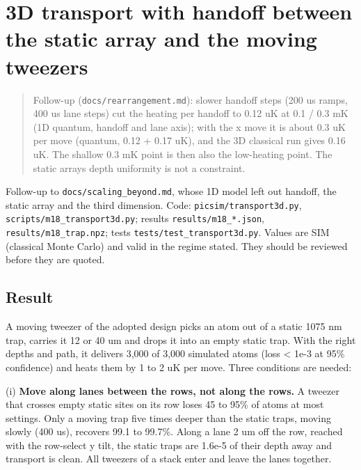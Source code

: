 \hypertarget{3d-transport-with-handoff-between-the-static-array-and-the-moving-tweezers}{%
\chapter{3D transport with handoff between the static array and the
moving
tweezers}\label{transport3d-3d-transport-with-handoff-between-the-static-array-and-the-moving-tweezers}}

\begin{quote}
Follow-up (\texttt{docs/rearrangement.md}): slower handoff steps (200 us
ramps, 400 us lane steps) cut the heating per handoff to 0.12 uK at 0.1
/ 0.3 mK (1D quantum, handoff and lane axis); with the x move it is
about 0.3 uK per move (quantum, 0.12 + 0.17 uK), and the 3D classical
run gives 0.16 uK. The shallow 0.3 mK point is then also the low-heating
point. The static array\textquotesingle s depth uniformity is not a
constraint.
\end{quote}

Follow-up to \texttt{docs/scaling\_beyond.md}, whose 1D model left out
handoff, the static array and the third dimension. Code:
\texttt{picsim/transport3d.py}, \texttt{scripts/m18\_transport3d.py};
results \texttt{results/m18\_*.json}, \texttt{results/m18\_trap.npz};
tests \texttt{tests/test\_transport3d.py}. Values are SIM (classical
Monte Carlo) and valid in the regime stated. They should be reviewed
before they are quoted.

\hypertarget{1-result}{%
\section{Result}\label{transport3d-1-result}}

A moving tweezer of the adopted design picks an atom out of a static
1075 nm trap, carries it 12 or 40 um and drops it into an empty static
trap. With the right depths and path, it delivers 3,000 of 3,000
simulated atoms (loss \textless{} 1e-3 at 95\% confidence) and heats
them by 1 to 2 uK per move. Three conditions are needed:

(i) \textbf{Move along lanes between the rows, not along the rows.} A
tweezer that crosses empty static sites on its row loses 45 to 95\% of
atoms at most settings. Only a moving trap five times deeper than the
static traps, moving slowly (400 us), recovers 99.1 to 99.7\%. Along a
lane 2 um off the row, reached with the row-select y tilt, the static
traps are 1.6e-5 of their depth away and transport is clean. All
tweezers of a stack enter and leave the lanes together.

